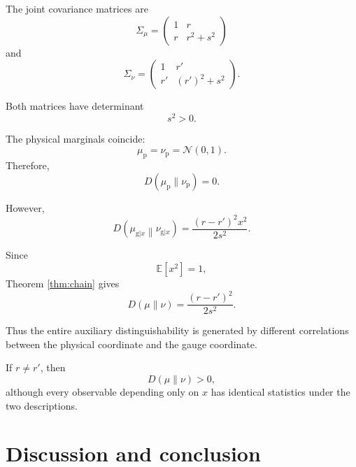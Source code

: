 \documentclass[11pt]{article}
\theoremstyle{remark}
\begin{document}
The joint covariance matrices are
\begin{equation}
\Sigma_\mu
=
\begin{pmatrix}
1&r\\
r&r^2+s^2
\end{pmatrix}
\label{eq:Sigma-mu}
\end{equation}
and
\begin{equation}
\Sigma_\nu
=
\begin{pmatrix}
1&r'\\
r'&(r')^2+s^2
\end{pmatrix}.
\label{eq:Sigma-nu}
\end{equation}

Both matrices have determinant
\begin{equation}
s^2>0.
\end{equation}

The physical marginals coincide:
\begin{equation}
\mu_{\mathrm p}
=
\nu_{\mathrm p}
=
\mathcal N(0,1).
\label{eq:same-physical}
\end{equation}
Therefore,
\begin{equation}
D(\mu_{\mathrm p}\|\nu_{\mathrm p})
=
0.
\label{eq:zero-physical}
\end{equation}

However,
\begin{equation}
D\left(
\mu_{\mathrm g|x}
\middle\|
\nu_{\mathrm g|x}
\right)
=
\frac{
(r-r')^2x^2
}{
2s^2
}.
\label{eq:conditional-example}
\end{equation}

Since
\begin{equation}
\mathbb E[x^2]=1,
\end{equation}
Theorem \ref{thm:chain} gives
\begin{equation}
\boxed{
D(\mu\|\nu)
=
\frac{
(r-r')^2
}{
2s^2
}.
}
\label{eq:example-result}
\end{equation}

Thus the entire auxiliary distinguishability is generated by
different correlations between the physical coordinate and
the gauge coordinate.

If \(r\neq r'\), then
\begin{equation}
D(\mu\|\nu)>0,
\end{equation}
although every observable depending only on \(x\) has
identical statistics under the two descriptions.

\section{Discussion and conclusion}
\end{document}
